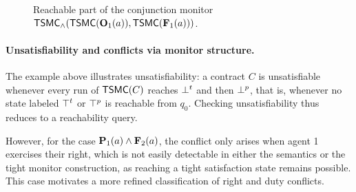   \begin{figure}[h!]
  \centering
  \caption{Reachable part of the conjunction monitor $\tsmc_{\wedge}(\tsmc(\obl[1]{a}),\tsmc(\frb[1]{a}))$.}
  \label{fig:tsmc-obl-and-frb-unreachable}
  \end{figure}
  
  \paragraph{Unsatisfiability and conflicts via monitor structure.}
The example above illustrates unsatisfiability: a contract $C$ is unsatisfiable whenever every run of $\tsmc(C)$ reaches $\bott$ and then $\botp$, that is, whenever no state labeled $\topt$ or $\topp$ is reachable from $q_0$. Checking unsatisfiability thus reduces to a reachability query.

However, for the case $\perm[1]{a}\wedge\frb[2]{a}$, the conflict only arises when agent 1 exercises their right, which is not easily detectable in either the semantics or the tight monitor construction, as reaching a tight satisfaction state remains possible. This case motivates a more refined classification of right and duty conflicts.
  

